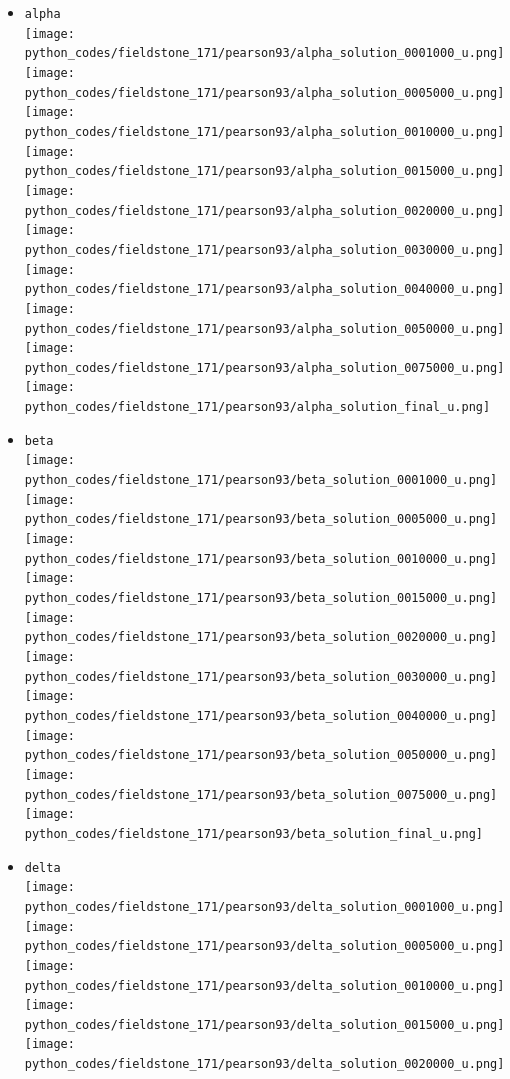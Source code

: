 \begin{itemize}
\item {\tt alpha}\\
\texttt{[image: python\_codes/fieldstone\_171/pearson93/alpha\_solution\_0001000\_u.png]}
\texttt{[image: python\_codes/fieldstone\_171/pearson93/alpha\_solution\_0005000\_u.png]}
\texttt{[image: python\_codes/fieldstone\_171/pearson93/alpha\_solution\_0010000\_u.png]}
\texttt{[image: python\_codes/fieldstone\_171/pearson93/alpha\_solution\_0015000\_u.png]}
\texttt{[image: python\_codes/fieldstone\_171/pearson93/alpha\_solution\_0020000\_u.png]}\\
\texttt{[image: python\_codes/fieldstone\_171/pearson93/alpha\_solution\_0030000\_u.png]}
\texttt{[image: python\_codes/fieldstone\_171/pearson93/alpha\_solution\_0040000\_u.png]}
\texttt{[image: python\_codes/fieldstone\_171/pearson93/alpha\_solution\_0050000\_u.png]}
\texttt{[image: python\_codes/fieldstone\_171/pearson93/alpha\_solution\_0075000\_u.png]}
\texttt{[image: python\_codes/fieldstone\_171/pearson93/alpha\_solution\_final\_u.png]}
\item {\tt beta}\\
\texttt{[image: python\_codes/fieldstone\_171/pearson93/beta\_solution\_0001000\_u.png]}
\texttt{[image: python\_codes/fieldstone\_171/pearson93/beta\_solution\_0005000\_u.png]}
\texttt{[image: python\_codes/fieldstone\_171/pearson93/beta\_solution\_0010000\_u.png]}
\texttt{[image: python\_codes/fieldstone\_171/pearson93/beta\_solution\_0015000\_u.png]}
\texttt{[image: python\_codes/fieldstone\_171/pearson93/beta\_solution\_0020000\_u.png]}\\
\texttt{[image: python\_codes/fieldstone\_171/pearson93/beta\_solution\_0030000\_u.png]}
\texttt{[image: python\_codes/fieldstone\_171/pearson93/beta\_solution\_0040000\_u.png]}
\texttt{[image: python\_codes/fieldstone\_171/pearson93/beta\_solution\_0050000\_u.png]}
\texttt{[image: python\_codes/fieldstone\_171/pearson93/beta\_solution\_0075000\_u.png]}
\texttt{[image: python\_codes/fieldstone\_171/pearson93/beta\_solution\_final\_u.png]}
\item {\tt delta}\\
\texttt{[image: python\_codes/fieldstone\_171/pearson93/delta\_solution\_0001000\_u.png]}
\texttt{[image: python\_codes/fieldstone\_171/pearson93/delta\_solution\_0005000\_u.png]}
\texttt{[image: python\_codes/fieldstone\_171/pearson93/delta\_solution\_0010000\_u.png]}
\texttt{[image: python\_codes/fieldstone\_171/pearson93/delta\_solution\_0015000\_u.png]}
\texttt{[image: python\_codes/fieldstone\_171/pearson93/delta\_solution\_0020000\_u.png]}\\

\end{itemize}
